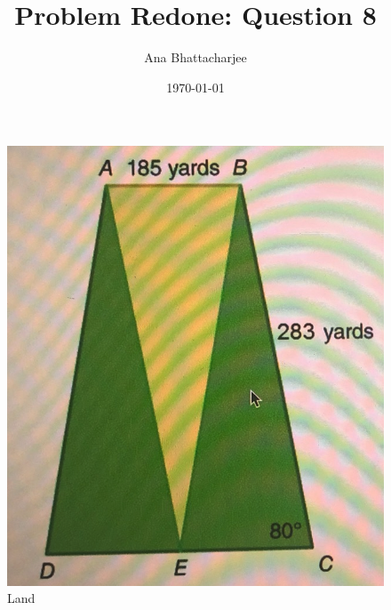 \documentclass{article}
\begin{document}
\title{Problem Redone: Question 8}
\author{Ana Bhattacharjee}
\date{\today}
\maketitle

\begin{center}
  \begin{figure}[!htbp]
    \includegraphics[width=0.90\columnwidth]{new_image}
    \caption{Land}
  \end{figure}
\end{center}
\end{document}
